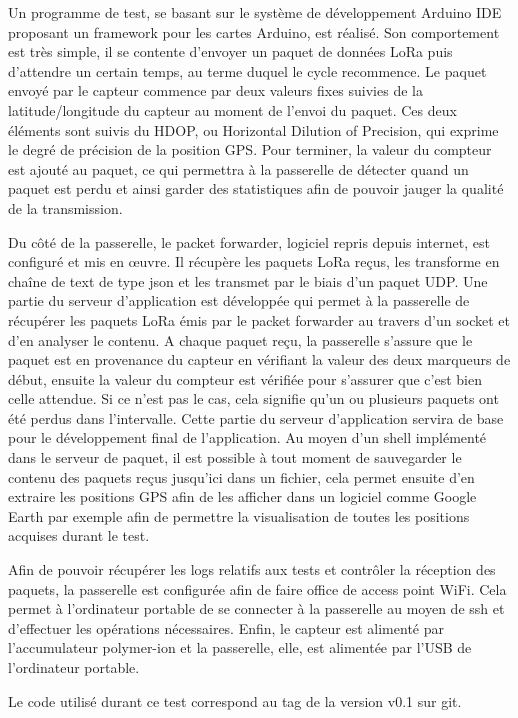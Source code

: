 Un programme de test, se basant sur le système de développement Arduino IDE proposant un framework pour les cartes Arduino, est réalisé. Son comportement est très simple, il se contente d'envoyer un paquet de données LoRa puis d'attendre un certain temps, au terme duquel le cycle recommence. Le paquet envoyé par le capteur commence par deux valeurs fixes suivies de la latitude/longitude du capteur au moment de l'envoi du paquet. Ces deux éléments sont suivis du HDOP, ou Horizontal Dilution of Precision, qui exprime le degré de précision de la position GPS. Pour terminer, la valeur du compteur est ajouté au paquet, ce qui permettra à la passerelle de détecter quand un paquet est perdu et ainsi garder des statistiques afin de pouvoir jauger la qualité de la transmission.

Du côté de la passerelle, le packet forwarder, logiciel repris depuis internet, est configuré et mis en œuvre. Il récupère les paquets LoRa reçus, les transforme en chaîne de text de type json et les transmet par le biais d'un paquet UDP. Une partie du serveur d'application est développée qui permet à la passerelle de récupérer les paquets LoRa émis par le packet forwarder au travers d'un socket et d'en analyser le contenu. A chaque paquet reçu, la passerelle s'assure que le paquet est en provenance du capteur en vérifiant la valeur des deux marqueurs de début, ensuite la valeur du compteur est vérifiée pour s'assurer que c'est bien celle attendue. Si ce n'est pas le cas, cela signifie qu'un ou plusieurs paquets ont été perdus dans l'intervalle. Cette partie du serveur d'application servira de base pour le développement final de l'application. 
Au moyen d'un shell implémenté dans le serveur de paquet, il est possible à tout moment de sauvegarder le contenu des paquets reçus jusqu'ici dans un fichier, cela permet ensuite d'en extraire les positions GPS afin de les afficher dans un logiciel comme Google Earth par exemple afin de permettre la visualisation de toutes les positions acquises durant le test.

Afin de pouvoir récupérer les logs relatifs aux tests et contrôler la réception des paquets, la passerelle est configurée afin de faire office de access point WiFi. Cela permet à l'ordinateur portable de se connecter à la passerelle au moyen de ssh et d'effectuer les opérations nécessaires.
Enfin, le capteur est alimenté par l'accumulateur polymer-ion et la passerelle, elle, est alimentée par l'USB de l'ordinateur portable.

Le code utilisé durant ce test correspond au tag de la version v0.1 sur git.

